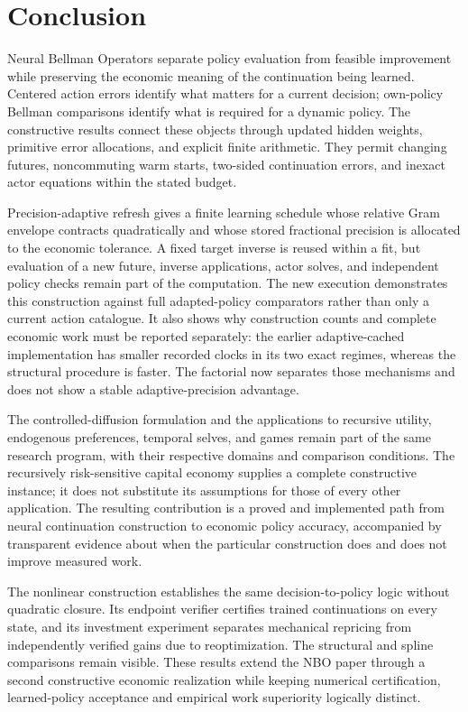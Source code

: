 \documentclass[ecta,nameyear,draft]{econsocart}
\theoremstyle{definition}
\theoremstyle{remark}
\begin{document}
\section{Conclusion}\label{sec:r37conclusion}
Neural Bellman Operators separate policy evaluation from feasible improvement
while preserving the economic meaning of the continuation being learned.
Centered action errors identify what matters for a current decision;
own-policy Bellman comparisons identify what is required for a dynamic
policy. The constructive results connect these objects through updated
hidden weights, primitive error allocations, and explicit finite arithmetic.
They permit changing futures, noncommuting warm starts, two-sided
continuation errors, and inexact actor equations within the stated budget.

Precision-adaptive refresh gives a finite learning schedule whose relative
Gram envelope contracts quadratically and whose stored fractional precision
is allocated to the economic tolerance. A fixed target inverse is reused
within a fit, but evaluation of a new future, inverse applications, actor
solves, and independent policy checks remain part of the computation. The
new execution demonstrates this construction against full adapted-policy
comparators rather than only a current action catalogue. It also shows why
construction counts and complete economic work must be reported separately:
the earlier adaptive-cached implementation has smaller recorded clocks in its two exact regimes, whereas the structural procedure is faster. The factorial now separates those mechanisms and does not show a stable adaptive-precision advantage.

The controlled-diffusion formulation and the applications to recursive
utility, endogenous preferences, temporal selves, and games remain part of
the same research program, with their respective domains and comparison
conditions. The recursively risk-sensitive capital economy supplies a
complete constructive instance; it does not substitute its assumptions for
those of every other application. The resulting contribution is a proved
and implemented path from neural continuation construction to economic
policy accuracy, accompanied by transparent evidence about when the
particular construction does and does not improve measured work.


The nonlinear construction establishes the same decision-to-policy logic without quadratic closure. Its endpoint verifier certifies trained continuations on every state, and its investment experiment separates mechanical repricing from independently verified gains due to reoptimization. The structural and spline comparisons remain visible. These results extend the NBO paper through a second constructive economic realization while keeping numerical certification, learned-policy acceptance and empirical work superiority logically distinct.
\end{document}
